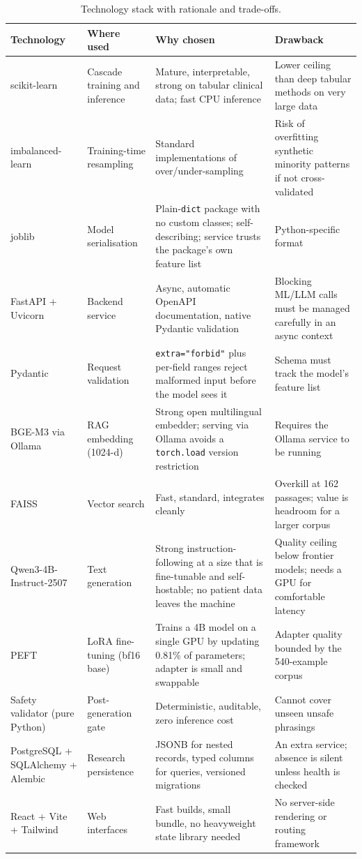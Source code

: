 \begin{table}[H]
\centering
\caption{Technology stack with rationale and trade-offs.}
\label{tab:stack}
\scriptsize
\begin{tabularx}{\textwidth}{@{}L{0.92in} L{0.85in} X X@{}}
\toprule
\textbf{Technology} & \textbf{Where used} & \textbf{Why chosen} &
\textbf{Drawback} \\
\midrule
scikit-learn \cite{pedregosa2011} & Cascade training and inference & Mature,
interpretable, strong on tabular clinical data; fast CPU inference &
Lower ceiling than deep tabular methods on very large data \\
imbalanced-learn & Training-time resampling & Standard implementations of
over/under-sampling &
Risk of overfitting synthetic minority patterns if not cross-validated \\
joblib & Model serialisation & Plain-\texttt{dict} package with no custom
classes; self-describing; service trusts the package's own feature list &
Python-specific format \\
FastAPI \cite{fastapi} + Uvicorn & Backend service & Async, automatic OpenAPI
documentation, native Pydantic validation &
Blocking ML/LLM calls must be managed carefully in an async context \\
Pydantic & Request validation & \texttt{extra="forbid"} plus per-field ranges
reject malformed input before the model sees it &
Schema must track the model's feature list \\
BGE-M3 via Ollama & RAG embedding (1024-d) & Strong open multilingual embedder;
serving via Ollama avoids a \texttt{torch.load} version restriction &
Requires the Ollama service to be running \\
FAISS & Vector search & Fast, standard, integrates cleanly &
Overkill at 162 passages; value is headroom for a larger corpus \\
Qwen3-4B-Instruct-2507 & Text generation & Strong instruction-following at a
size that is fine-tunable and self-hostable; no patient data leaves the machine &
Quality ceiling below frontier models; needs a GPU for comfortable latency \\
PEFT & LoRA fine-tuning (bf16 base) & Trains a 4B model on a single GPU by
updating 0.81\% of parameters; adapter is small and swappable &
Adapter quality bounded by the 540-example corpus \\
Safety validator (pure Python) & Post-generation gate & Deterministic,
auditable, zero inference cost &
Cannot cover unseen unsafe phrasings \\
PostgreSQL + SQLAlchemy + Alembic & Research persistence & JSONB for nested
records, typed columns for queries, versioned migrations &
An extra service; absence is silent unless health is checked \\
React + Vite + Tailwind & Web interfaces & Fast builds, small bundle,
no heavyweight state library needed &
No server-side rendering or routing framework \\
\bottomrule
\end{tabularx}
\end{table}

